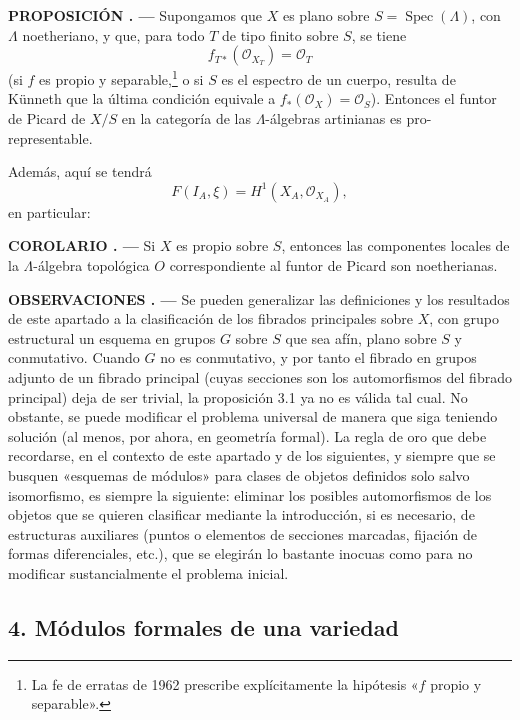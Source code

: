 \documentclass[11pt,twoside,openany]{book}
\numberwithin{equation}{section}
\newcommand{\src}[1]{%
  \phantomsection\hypertarget{src:#1}{}%
  \marginpar{\raggedleft\footnotesize\sffamily #1}%
}
\theoremstyle{plain}
\theoremstyle{definition}
\theoremstyle{remark}
\newcommand{\result}[2]{%
  \par\medskip\noindent\textbf{#1%
  \if\relax\detokenize{#2}\relax\else\space#2\fi. ---}\enspace
}
\newcommand{\FgaUnitKey}{frontmatter}
\renewcommand{\src}[1]{%
  \phantomsection\hypertarget{src:\FgaUnitKey:#1}{}%
  \marginpar{\raggedleft\footnotesize\sffamily #1}%
}
\theoremstyle{plain}
\theoremstyle{definition}
\theoremstyle{remark}
\begin{document}
\src{384}
\result{PROPOSICIÓN}{3.1} Supongamos que $X$ es plano sobre
$S=\operatorname{Spec}(\Lambda)$, con $\Lambda$ noetheriano, y que, para todo
$T$ de tipo finito sobre $S$, se tiene
\[
  f_{T*}(\mathcal O_{X_T})=\mathcal O_T
\]
(si $f$ es propio y separable,\footnote{La fe de erratas de 1962 prescribe
explícitamente la hipótesis «$f$ propio y separable».} o si $S$ es el espectro
de un cuerpo, resulta de Künneth que la última condición equivale a
$f_*(\mathcal O_X)=\mathcal O_S$). Entonces el funtor de Picard de $X/S$ en la
categoría de las $\Lambda$-álgebras artinianas es pro-representable.

Además, aquí se tendrá
\[
  F(I_A,\xi)=H^1(X_A,\mathcal O_{X_A}),
\]
en particular:

\result{COROLARIO}{} Si $X$ es propio sobre $S$, entonces las componentes
locales de la $\Lambda$-álgebra topológica $O$ correspondiente al funtor de
Picard son noetherianas.

\result{OBSERVACIONES}{} Se pueden generalizar las definiciones y los resultados
de este apartado a la clasificación de los fibrados principales sobre $X$, con
grupo estructural un esquema en grupos $G$ sobre $S$ que sea afín, plano sobre
$S$ y conmutativo. Cuando $G$ no es conmutativo, y por tanto el fibrado en
grupos adjunto de un fibrado principal (cuyas secciones son los automorfismos
del fibrado principal) deja de ser trivial, la proposición 3.1 ya no es válida
tal cual. No obstante, se puede modificar el problema universal de manera que
siga teniendo solución (al menos, por ahora, en geometría formal). La regla de
oro que debe recordarse, en el contexto de este \src{385}apartado y de los
siguientes, y siempre que se busquen «esquemas de módulos» para clases de
objetos definidos solo salvo isomorfismo, es siempre la siguiente: eliminar
los posibles automorfismos de los objetos que se quieren clasificar mediante
la introducción, si es necesario, de estructuras auxiliares (puntos o
elementos de secciones marcadas, fijación de formas diferenciales, etc.), que
se elegirán lo bastante inocuas como para no modificar sustancialmente el
problema inicial.

\subsection*{4. Módulos formales de una variedad}
\end{document}
